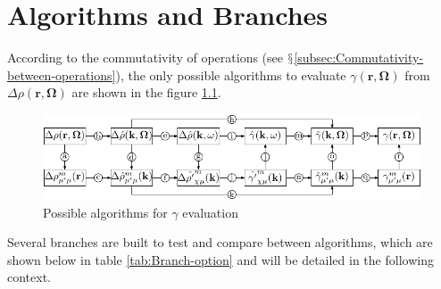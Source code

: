 
\chapter{Algorithms and Branches\label{chpt:algorithms-and-branches}}

According to the commutativity of operations (see $\mathsection$\ref{subsec:Commutativity-between-operations}),
the only possible algorithms to evaluate $\gamma(\mathbf{r},\mathbf{\Omega})$
from $\Delta\rho(\mathbf{r},\mathbf{\Omega})$ are shown in the figure
\ref{fig:Possible-algorithms}.

\begin{figure}[h]
\begin{centering}
\includegraphics{_figure/algorithms}
\par\end{centering}
\caption{Possible algorithms for $\gamma$ evaluation\label{fig:Possible-algorithms}}
\end{figure}

Several branches are built to test and compare between algorithms,
which are shown below in table \ref{tab:Branch-option} and will be
detailed in the following context. 

